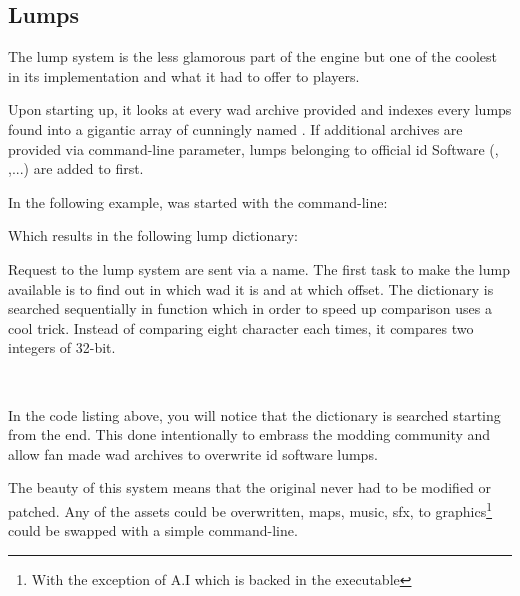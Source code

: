 \subsection{Lumps}
The lump system is the less glamorous part of the engine but one of the coolest in its implementation and what it had to offer to players.\\
\par
Upon starting up, it looks at every wad archive provided and indexes every lumps found into a gigantic array of  cunningly named . 
If additional archives are provided via  command-line parameter, lumps belonging to official id Software (, ,...) are added to  first.\\
\par
In the following example, \doom was started with the command-line:\\
\par
{}
\par
Which results in the following lump dictionary:\\
\par
{}
\par
Request to the lump system are sent via a  name. The first task to make the lump available is to find out in which wad it is and at which offset. The dictionary is searched sequentially in function  which in order to speed up comparison uses a cool trick. Instead of comparing eight character each times, it compares two integers of 32-bit.\\
\par
{}\\
\par
In the code listing above, you will notice that the dictionary is searched starting from the end. This done intentionally to embrass the modding community and allow fan made wad archives to overwrite id software lumps.\\
\par
The beauty of this system means that the original  never had to be modified or patched. Any of the assets could be overwritten, maps, music, sfx, to graphics\footnote{With the exception of A.I which is backed in the executable} could be swapped with a simple command-line.\\
